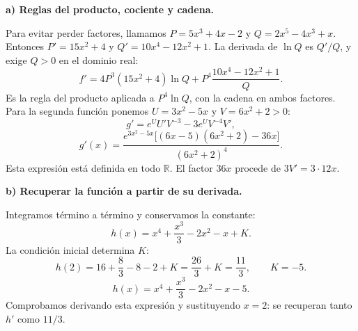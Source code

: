 \textbf{a) Reglas del producto, cociente y cadena.}\par\nopagebreak[4]
Para evitar perder factores, llamamos $P=5x^3+4x-2$ y $Q=2x^5-4x^3+x$. Entonces $P'=15x^2+4$ y $Q'=10x^4-12x^2+1$. La derivada de $\ln Q$ es $Q'/Q$, y exige $Q>0$ en el dominio real:
\[
\boxed{f'=4P^3(15x^2+4)\ln Q+P^4\frac{10x^4-12x^2+1}{Q}.}
\]
Es la regla del producto aplicada a $P^4\ln Q$, con la cadena en ambos factores. Para la segunda función ponemos $U=3x^2-5x$ y $V=6x^2+2>0$:
\[
g'=e^U U' V^{-3}-3e^U V^{-4}V',
\]
\[
\boxed{g'(x)=\frac{e^{3x^2-5x}\big[(6x-5)(6x^2+2)-36x\big]}{(6x^2+2)^4}.}
\]
Esta expresión está definida en todo $\mathbb R$. El factor $36x$ procede de $3V'=3\cdot12x$.

\textbf{b) Recuperar la función a partir de su derivada.}\par\nopagebreak[4]
Integramos término a término y conservamos la constante:
\[
h(x)=x^4+\frac{x^3}{3}-2x^2-x+K.
\]
La condición inicial determina $K$:
\[
h(2)=16+\frac83-8-2+K=\frac{26}{3}+K=\frac{11}{3},
\qquad K=-5.
\]
\[
\boxed{h(x)=x^4+\frac{x^3}{3}-2x^2-x-5.}
\]
Comprobamos derivando esta expresión y sustituyendo $x=2$: se recuperan tanto $h'$ como $11/3$.
